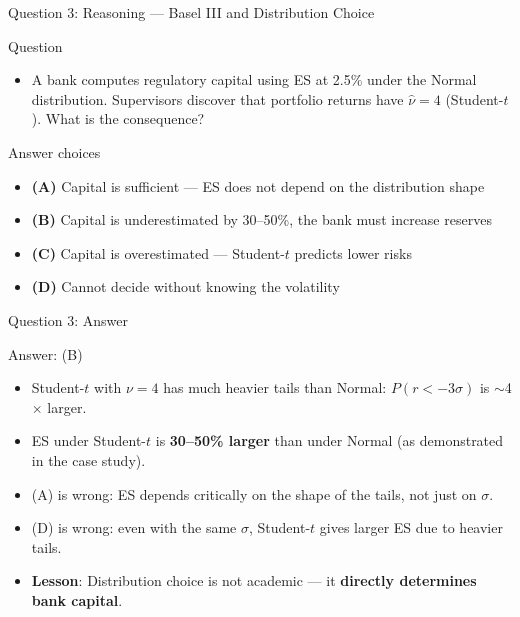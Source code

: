 \documentclass[9pt, aspectratio=169, t]{beamer}
\theoremstyle{definition}
\newenvironment{cminipage}[1]{%
    \par\noindent\hfill\begin{minipage}{#1}\ignorespaces
}{%
    \end{minipage}\hfill\null\par
}
\begin{document}
\begin{frame}{Question 3: Reasoning --- Basel III and Distribution Choice}
    \begin{cminipage}{0.95\textwidth}
    \begin{alertblock}{Question}
        \begin{itemize}
            \item A bank computes regulatory capital using ES at 2.5\% under the Normal distribution. Supervisors discover that portfolio returns have $\hat{\nu} = 4$ (Student-$t$). What is the consequence?
        \end{itemize}
    \end{alertblock}

    \vspace{0.3cm}

    \begin{block}{Answer choices}
        \begin{itemize}\setlength{\itemsep}{2pt}
        \item \textcolor{MainBlue}{\textbf{(A)}} Capital is sufficient --- ES does not depend on the distribution shape
        \item \textcolor{MainBlue}{\textbf{(B)}} Capital is underestimated by 30--50\%, the bank must increase reserves
        \item \textcolor{MainBlue}{\textbf{(C)}} Capital is overestimated --- Student-$t$ predicts lower risks
        \item \textcolor{MainBlue}{\textbf{(D)}} Cannot decide without knowing the volatility
        \end{itemize}
    \end{block}
    \end{cminipage}
\end{frame}

\begin{frame}{Question 3: Answer}
    \begin{cminipage}{0.95\textwidth}
    \begin{exampleblock}{Answer: (B)}
    \begin{itemize}
        \item Student-$t$ with $\nu = 4$ has much heavier tails than Normal: $P(r < -3\sigma)$ is $\sim$4$\times$ larger.
        \item ES under Student-$t$ is \textbf{30--50\% larger} than under Normal (as demonstrated in the case study).
        \item (A) is wrong: ES depends critically on the shape of the tails, not just on $\sigma$.
        \item (D) is wrong: even with the same $\sigma$, Student-$t$ gives larger ES due to heavier tails.
        \item \textbf{Lesson}: Distribution choice is not academic --- it \textbf{directly determines bank capital}.
    \end{itemize}
    \end{exampleblock}
    \end{cminipage}
\end{frame}
\end{document}
